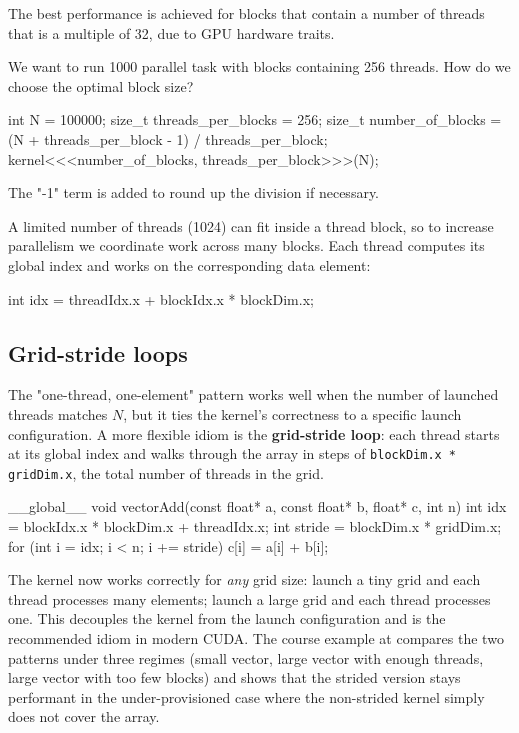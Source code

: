 The best performance is achieved for blocks that contain a number of threads that is a multiple of 32, due to GPU hardware traits.

\begin{exampleblock}
We want to run 1000 parallel task with blocks containing 256 threads. How do we choose the optimal block size?

\begin{codeblock}[language=C]
int N = 100000; size_t threads_per_blocks = 256;
size_t number_of_blocks = (N + threads_per_block - 1) / threads_per_block;
kernel<<<number_of_blocks, threads_per_block>>>(N);
\end{codeblock}

The "-1" term is added to round up the division if necessary.
\end{exampleblock}

A limited number of threads (1024) can fit inside a thread block, so to increase parallelism we coordinate work across many blocks. Each thread computes its global index and works on the corresponding data element:

\begin{codeblock}[language=C]
int idx = threadIdx.x + blockIdx.x * blockDim.x;
\end{codeblock}

\subsection{Grid-stride loops}

The "one-thread, one-element" pattern works well when the number of launched threads matches $N$, but it ties the kernel's correctness to a specific launch configuration. A more flexible idiom is the \textbf{grid-stride loop}: each thread starts at its global index and walks through the array in steps of \texttt{blockDim.x * gridDim.x}, the total number of threads in the grid.

\begin{codeblock}[language=C]
__global__ void vectorAdd(const float* a, const float* b, float* c, int n) {
    int idx    = blockIdx.x * blockDim.x + threadIdx.x;
    int stride = blockDim.x * gridDim.x;
    for (int i = idx; i < n; i += stride)
        c[i] = a[i] + b[i];
}
\end{codeblock}

The kernel now works correctly for \emph{any} grid size: launch a tiny grid and each thread processes many elements; launch a large grid and each thread processes one. This decouples the kernel from the launch configuration and is the recommended idiom in modern CUDA. The course example at  compares the two patterns under three regimes (small vector, large vector with enough threads, large vector with too few blocks) and shows that the strided version stays performant in the under-provisioned case where the non-strided kernel simply does not cover the array.

